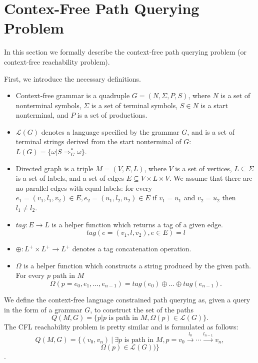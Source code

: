 \section{Contex-Free Path Querying Problem}
\label{sec:CFPQ}

In this section we formally describe the context-free path querying problem (or context-free reachability problem).


First, we introduce the necessary definitions.
\begin{itemize}
  \item Context-free grammar is a quadruple $G=(N, \Sigma, P, S)$, where $N$ is a set of nonterminal symbols, $\Sigma$ is a set of terminal symbols, $S \in N$ is a start nonterminal, and $P$ is a set of productions. 
  \item $\mathcal{L}(G)$ denotes a language specified by the grammar $G$, and is a set of terminal strings derived from the start nonterminal of $G$: $L(G) = \{\omega | S \Rightarrow_{G}^{*} \omega\}$.
  \item Directed graph is a triple $M = (V,E,L)$, where $V$ is a set of vertices, $L \subseteq \Sigma$ is a set of labels, and a set of edges $E\subseteq V\times L\times V$. 
  We assume that there are no parallel edges with equal labels: for every $e_1=(v_1,l_1,v_2) \in E, e_2=(u_1,l_2,u_2) \in E$ if $v_1 = u_1$ and $v_2 = u_2$ then $l_1 \neq l_2$.
  \item $tag: E \rightarrow L$ is a helper function which returns a tag of a given edge. $$tag(e = (v_1,l,v_2), e \in E) = l$$
  \item $\oplus: L^+ \times L^+ \rightarrow L^+$ denotes a tag concatenation operation.
  \item $\Omega$ is a helper function which constructs a string produced by the given path. For every $p \text{ path in } M$
  $$ \Omega(p = e_{0},e_{1},\dots,e_{n-1}) = tag (e_{0}) \oplus \dots \oplus tag (e_{n-1}).$$
\end{itemize}

We define the context-free language constrained path querying as, given a query in the form of a grammar $G$, to construct the set of the paths $$Q(M,G)=\{p|p \text{ is path in } M, \Omega(p) \in \mathcal{L}(G)\}.$$
The CFL reachability problem is pretty similar and is formulated as follows: $$Q(M,G) =\{ (v_0,v_n) \ | \ \exists p \text{ is path in } M, p = v_0 \xrightarrow{l_0} \cdots \xrightarrow{l_{n-1}}v_n,$$
$$ \Omega(p) \in   \mathcal{L}(G))\}$$.

